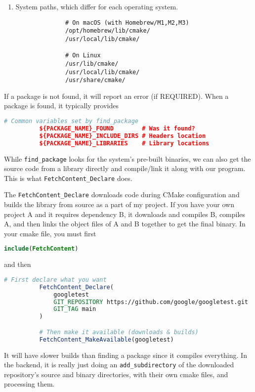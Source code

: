 \documentclass{article}
\begin{document}
\begin{definition}
\begin{enumerate}
          \item System paths, which differ for each operating system. 
            \begin{lstlisting}
              # On macOS (with Homebrew/M1,M2,M3)
              /opt/homebrew/lib/cmake/
              /usr/local/lib/cmake/

              # On Linux
              /usr/lib/cmake/
              /usr/local/lib/cmake/
              /usr/share/cmake/
            \end{lstlisting}
        \end{enumerate}

        If a package is not found, it will report an error (if REQUIRED). When a package is found, it typically provides 
        \begin{lstlisting}[language=CMake]
          # Common variables set by find_package
          ${PACKAGE_NAME}_FOUND        # Was it found?
          ${PACKAGE_NAME}_INCLUDE_DIRS # Headers location
          ${PACKAGE_NAME}_LIBRARIES    # Library locations 
        \end{lstlisting}
      \end{definition}

      While \texttt{find\_package} looks for the system's pre-built binaries, we can also get the source code from a library directly and compile/link it along with our program. This is what \texttt{FetchContent\_Declare} does. 

      \begin{definition}
        The \texttt{FetchContent\_Declare} downloads code during CMake configuration and builds the library from source as a part of my project. If you have your own project A and it requires dependency B, it downloads and compiles B, compiles A, and then links the object files of A and B together to get the final binary. In your cmake file, you must first 
        \begin{lstlisting}[language=CMake]
          include(FetchContent)
        \end{lstlisting}
        and then 
        \begin{lstlisting}[language=CMake]
          # First declare what you want
          FetchContent_Declare(
              googletest
              GIT_REPOSITORY https://github.com/google/googletest.git
              GIT_TAG main
          )

          # Then make it available (downloads & builds)
          FetchContent_MakeAvailable(googletest)
        \end{lstlisting}
        It will have slower builds than finding a package since it compiles everything. In the backend, it is really just doing an \texttt{add\_subdirectory} of the downloaded repository's source and binary directories, with their own cmake files, and processing them. 
      \end{definition}
\end{document}
